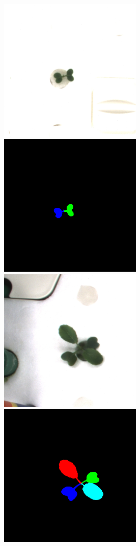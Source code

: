 \documentclass[12pt]{article}
\begin{document}
\begin{center}
\begin{figure}[H]
\centering
\includegraphics[width = 2.7in]{rgb_00_01_000_00.png}
\hspace{1cm}
\includegraphics[width = 2.7in]{label_00_01_000_00.png}\\
\vspace{1cm}
\includegraphics[width = 2.7in]{rgb_00_00_004_01.png}
\hspace{1cm}
\includegraphics[width = 2.7in]{label_00_00_004_01.png}
\end{figure}
\end{center}
\end{document}
